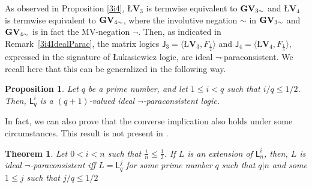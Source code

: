 \documentclass{article}
\newtheorem{theorem}{Theorem}
\newtheorem{proposition}{Proposition}
\theoremstyle{definition}
\newcommand{\algLfin}{\textbf{\L}\mathbf{V}}
\begin{document}
As observed in Proposition \ref{3i4},  
$\algLfin_{3}$ is {termwise} equivalent
to ${\bf GV}_{3 \sim}$ and $\algLfin_{4}$ is {termwise} equivalent to ${\bf GV}_{4 \sim}$, where the involutive negation $\sim$ in ${\bf GV}_{3\sim}$ and ${\bf GV}_{4\sim}$ is in fact the MV-negation $\neg$. Then, as indicated in   Remark~\ref{3i4IdealParac}, the matrix logics $\mathsf{J}_{3}= \langle \algLfin_{3}, F_{\frac{1}{2}} \rangle$ and $\mathsf{J}_{4}=\langle\algLfin_{4}, F_{\frac{1}{3}}\rangle$, expressed in the signature of {\L}ukasiewicz logic, are ideal $\neg$-paraconsistent. We recall here that this can be generalized in the following way.

\begin{proposition}\label{SufIdParLuk} \emph{\cite[Proposition 6.2 ]{CoEsGiGo}}
Let  $q$ be a prime number, and let $1 \leq i < q$ such that $i/q \leq 1/2$. Then,  $\mathsf{L}^i_q$ is a $(q+1)$-valued ideal $\neg$-paraconsistent logic.
\end{proposition}

In fact, we can also prove that the converse implication also holds under some circumstances. This result  is not present in \cite{CoEsGiGo}.

\begin{theorem}\label{teo-ideal}
Let $0<i<n$ such that $\frac{i}{n}\leq\frac{1}{2}$. If $L$ is an extension of  $\mathsf{L}_{n}^{i}$, then,
$L$ is ideal $\neg$-paraconsistent iff $L=\mathsf{L}_{q}^{j}$ for some prime number $q$ such that $q|n$ and some $1\leq j$ such that $j/q \leq 1/2$
\end{theorem}
\end{document}
